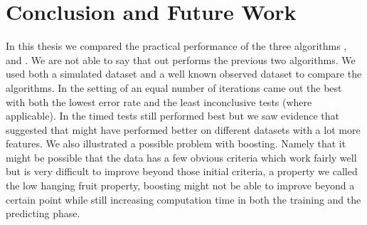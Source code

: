 
 
\chapter{Conclusion and Future Work} 
\label{sec:Concl}

In this thesis we compared the practical performance of the three algorithms \adaB, \NHB and \squintB. We are not able to say that \squintB out performs the previous two algorithms. We used both a simulated dataset and a well known observed dataset to compare the algorithms. In the setting of an equal number of iterations \NHB came out the best with both the lowest error rate and the least inconclusive tests (where applicable). In the timed tests \NHB still performed best but we saw evidence that suggested that \squintB might have performed better on different datasets with a lot more features. We also illustrated a possible problem with boosting. Namely that it might be possible that the data has a few obvious criteria which work fairly well but is very difficult to improve beyond those initial criteria, a property we called the low hanging fruit property, boosting might not be able to improve beyond a certain point while still increasing computation time in both the training and the predicting phase. 


